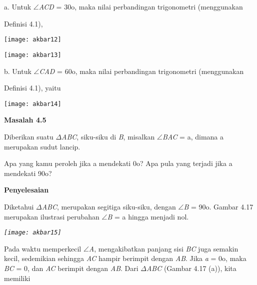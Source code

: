 \documentclass[11pt,fleqn]{book} %
\begin{document}
\noindent 

\noindent a. Untuk $\mathrm{\angle }$\textit{ACD }= 30o, maka nilai perbandingan trigonometri (menggunakan

\noindent Definisi 4.1),

\noindent \texttt{[image: akbar12]}

\noindent \texttt{[image: akbar13]}

\noindent 

\noindent b. Untuk $\mathrm{\angle }$\textit{CAD }= 60o, maka nilai perbandingan trigonometri (menggunakan

\noindent Definisi 4.1), yaitu

\noindent 

\noindent \texttt{[image: akbar14]}

\noindent 

\noindent \textbf{Masalah 4.5}

\noindent Diberikan suatu $\Delta$\textit{ABC}, siku-siku di \textit{B}, misalkan $\mathrm{\angle }$\textit{BAC }= a, dimana a merupakan sudut lancip.

\noindent 

\noindent Apa yang kamu peroleh jika a mendekati 0o? Apa pula yang terjadi jika a mendekati 90o?

\noindent \textbf{}

\noindent \textbf{Penyelesaian}

\noindent Diketahui $\Delta$\textit{ABC}, merupakan segitiga siku-siku, dengan $\mathrm{\angle }$\textit{B }= 90o. Gambar 4.17 merupakan ilustrasi perubahan $\mathrm{\angle }$\textit{B }= a hingga menjadi nol.\textit{}

\noindent \textit{}

\noindent \textit{}

\noindent \textit{}

\noindent \textit{}

\noindent \textit{}

\noindent \textit{\texttt{[image: akbar15]}}

\noindent \textbf{}

\noindent Pada waktu memperkecil $\mathrm{\angle }$\textit{A}, mengakibatkan panjang sisi \textit{BC }juga semakin kecil, sedemikian sehingga \textit{AC }hampir berimpit dengan \textit{AB}. Jika \textit{a }= 0o, maka \textit{BC }= 0, dan \textit{AC }berimpit dengan \textit{AB}. Dari $\Delta$\textit{ABC }(Gambar 4.17 (a)), kita memiliki
\end{document}
